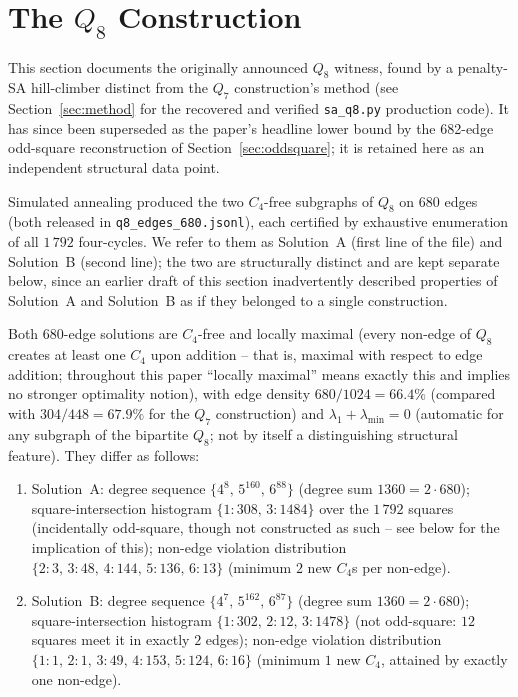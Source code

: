 \documentclass[12pt]{article}
\begin{document}
\section{The \texorpdfstring{$Q_8$}{Q8} Construction}\label{sec:q8}

This section documents the originally announced $Q_8$ witness, found by
a penalty-SA hill-climber distinct from the $Q_7$ construction's
method (see Section~\ref{sec:method} for the recovered and verified
\texttt{sa\_q8.py} production code). It has since been
superseded as the paper's headline lower bound by the 682-edge odd-square
reconstruction of Section~\ref{sec:oddsquare}; it is retained here as an
independent structural data point.

Simulated annealing produced the two $C_4$-free subgraphs of $Q_8$ on 680
edges (both released in \texttt{q8\_edges\_680.jsonl}), each certified by
exhaustive enumeration of all $1\,792$ four-cycles. We refer to them as
Solution~A (first line of the file) and Solution~B (second line); the
two are structurally distinct and are kept separate below, since an
earlier draft of this section inadvertently described properties of
Solution~A and Solution~B as if they belonged to a single construction.

\begin{proposition}\label{prop:q8struct}
Both 680-edge solutions are $C_4$-free and locally maximal (every
non-edge of $Q_8$ creates at least one $C_4$ upon addition -- that is,
maximal with respect to edge addition; throughout this paper ``locally
maximal'' means exactly this and implies no stronger optimality
notion), with edge
density $680/1024=66.4\%$ (compared with $304/448=67.9\%$ for the $Q_7$
construction) and $\lambda_1+\lambda_{\min}=0$ (automatic for any subgraph of
the bipartite $Q_8$; not by itself a distinguishing structural feature).
They differ as follows:
\begin{enumerate}[label=(\roman*)]
  \item Solution~A: degree sequence $\{4^8,\,5^{160},\,6^{88}\}$
    (degree sum $1360=2\cdot680$); square-intersection histogram
    $\{1\!:\!308,\,3\!:\!1484\}$ over the $1\,792$ squares (incidentally
    odd-square, though not constructed as such -- see below for the
    implication of this); non-edge violation
    distribution $\{2\!:\!3,\,3\!:\!48,\,4\!:\!144,\,5\!:\!136,\,6\!:\!13\}$
    (minimum $2$ new $C_4$s per non-edge).
  \item Solution~B: degree sequence $\{4^7,\,5^{162},\,6^{87}\}$
    (degree sum $1360=2\cdot680$); square-intersection histogram
    $\{1\!:\!302,\,2\!:\!12,\,3\!:\!1478\}$ (not odd-square: $12$ squares
    meet it in exactly $2$ edges); non-edge violation distribution
    $\{1\!:\!1,\,2\!:\!1,\,3\!:\!49,\,4\!:\!153,\,5\!:\!124,\,6\!:\!16\}$
    (minimum $1$ new $C_4$, attained by exactly one non-edge).
\end{enumerate}
\end{proposition}
\end{document}
